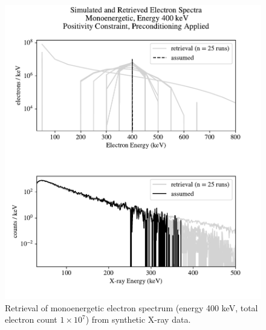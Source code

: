\begin{figure}[p]
    \centering
    \includegraphics[width=\textwidth]{figures/chapter_4/synthetic_data_examples/mono_400keV_posonly_preconditioning_1e7_particles}
    \caption{Retrieval of monoenergetic electron spectrum (energy 400 keV, total electron count $1\times10^7$) from synthetic X-ray data.}
    \label{why_non_negative_is_good}
\end{figure}

